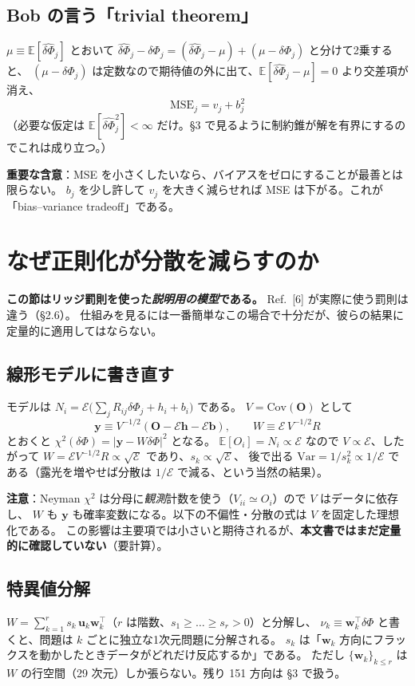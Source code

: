 \documentclass[11pt,a4paper]{ltjsarticle}
\newcommand{\dP}{\delta\Phi}
\newcommand{\dPh}{\widehat{\delta\Phi}}
\newcommand{\E}{\mathbb{E}}
\newcommand{\Var}{\mathrm{Var}}
\newcommand{\Cov}{\mathrm{Cov}}
\begin{document}
\subsection*{Bob の言う「trivial theorem」}
$\mu\equiv\E[\dPh_j]$ とおいて $\dPh_j-\dP_j=(\dPh_j-\mu)+(\mu-\dP_j)$ と分けて2乗すると、
$(\mu-\dP_j)$ は定数なので期待値の外に出て、$\E[\dPh_j-\mu]=0$ より交差項が消え、
\begin{equation}
\boxed{\ \mathrm{MSE}_j=v_j+b_j^2\ }
\end{equation}
（必要な仮定は $\E[\dPh_j^2]<\infty$ だけ。\S3 で見るように制約錐が解を有界にするのでこれは成り立つ。）

\textbf{重要な含意}：MSE を小さくしたいなら、バイアスをゼロにすることが最善とは限らない。
$b_j$ を少し許して $v_j$ を大きく減らせれば MSE は下がる。これが「bias--variance tradeoff」である。

\section{なぜ正則化が分散を減らすのか}

\textbf{この節はリッジ罰則を使った\emph{説明用の模型}である。} Ref.~[6] が実際に使う罰則は違う（\S2.6）。
仕組みを見るには一番簡単なこの場合で十分だが、彼らの結果に定量的に適用してはならない。

\subsection{線形モデルに書き直す}
モデルは $N_i=\mathcal{E}\big(\sum_j R_{ij}\dP_j+h_i+b_i\big)$ である。
$V=\Cov(\bm O)$ として
\begin{equation}
\bm y\equiv V^{-1/2}(\bm O-\mathcal{E}\bm h-\mathcal{E}\bm b),\qquad
W\equiv \mathcal{E}\,V^{-1/2}R
\end{equation}
とおくと $\chi^2(\dP)=|\bm y-W\dP|^2$ となる。
$\E[O_i]=N_i\propto\mathcal{E}$ なので $V\propto\mathcal{E}$、したがって
$W=\mathcal{E}V^{-1/2}R\propto\sqrt{\mathcal{E}}$ であり、$s_k\propto\sqrt{\mathcal{E}}$、
後で出る $\Var=1/s_k^2\propto 1/\mathcal{E}$ である（露光を増やせば分散は $1/\mathcal{E}$ で減る、という当然の結果）。

\textbf{注意}：Neyman $\chi^2$ は分母に\emph{観測}計数を使う（$V_{ii}\simeq O_i$）ので $V$ はデータに依存し、
$W$ も $\bm y$ も確率変数になる。以下の不偏性・分散の式は $V$ を固定した理想化である。
この影響は主要項では小さいと期待されるが、\textbf{本文書ではまだ定量的に確認していない}（要計算）。

\subsection{特異値分解}
$W=\sum_{k=1}^{r}s_k\,\bm u_k\bm w_k^{\!\top}$（$r$ は階数、$s_1\ge\dots\ge s_r>0$）と分解し、
$\nu_k\equiv\bm w_k^{\!\top}\dP$ と書くと、問題は $k$ ごとに独立な1次元問題に分解される。
$s_k$ は「$\bm w_k$ 方向にフラックスを動かしたときデータがどれだけ反応するか」である。
ただし $\{\bm w_k\}_{k\le r}$ は $W$ の行空間（29 次元）しか張らない。残り 151 方向は \S3 で扱う。
\end{document}
